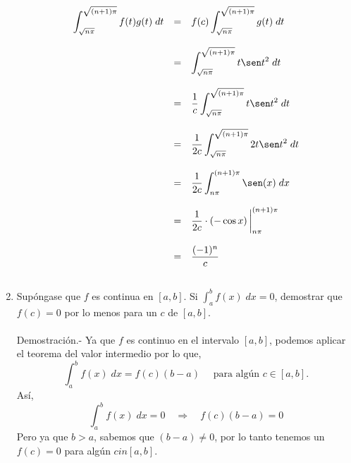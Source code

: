 \begin{enumerate}[\bfseries 1.]
	$$\begin{array}{rcl}
	    \displaystyle\int_{\sqrt{n\pi}}^{\sqrt{(n+1)\pi}} f(t)g(t)\; dt &=& f(c)\displaystyle\int_{\sqrt{n\pi}}^{\sqrt{(n+1)\pi}} g(t)\; dt\\\\
									    &=&\displaystyle\int_{\sqrt{n\pi}}^{\sqrt{(n+1)\pi}}t\sen t^2\; dt\\\\
									    &=&\dfrac{1}{c}\displaystyle\int_{\sqrt{n\pi}}^{\sqrt{(n+1)\pi}}t\sen t^2\; dt\\\\
									    &=&\dfrac{1}{2c}\displaystyle\int_{\sqrt{n\pi}}^{\sqrt{(n+1)\pi}} 2t\sen t^2\; dt\\\\
									    &=&\dfrac{1}{2c}\displaystyle\int_{n\pi}^{(n+1)\pi}\sen (x)\; dx\\\\
									    &=&\dfrac{1}{2c}\cdot \left(-\cos x\right)\bigg|_{n\pi}^{(n+1)\pi}\\\\
									    &=&\dfrac{(-1)^n}{c}\\\\
	\end{array}$$

    \item Supóngase que $f$ es continua en $[a,b]$. Si $\int_a^b f(x)\; dx=0$, demostrar que $f(c)=0$ por lo menos para un $c$ de $[a,b]$.\\\\
	Demostración.-\; Ya que $f$ es continuo en el intervalo $[a,b]$, podemos aplicar el teorema del valor intermedio por lo que,
	$$\int_a^b f(x)\; dx  = f(c)(b-a)\quad \mbox{ para algún } c\in [a,b].$$
	Así,
	$$\int_a^b f(x)\; dx = 0 \quad \Rightarrow \quad f(c)(b-a)=0$$
	Pero ya que $b>a$, sabemos que $(b-a)\neq 0$, por lo tanto tenemos un $f(c)=0$ para algún $cin [a,b]$.\\\\


\end{enumerate}
